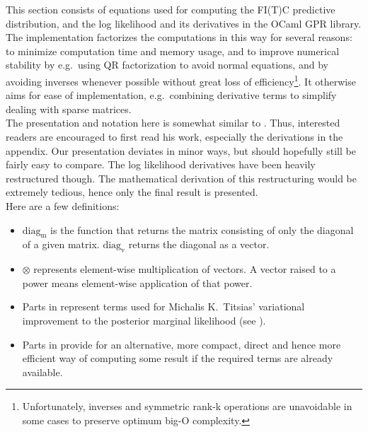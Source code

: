 \documentclass[10pt]{report}
\begin{document}
\newcommand{\Lam}{\mat{\Lambda}}
\newcommand{\Lamss}{\mat{\Lambda}_{\sigma^2}}
\newcommand{\Lamssi}{\imat{\Lambda_{\sigma^2}}}


This section consists of equations used for computing the FI(T)C predictive
distribution, and the log likelihood and its derivatives in the OCaml GPR
library.  The implementation factorizes the computations in this way for several
reasons: to minimize computation time and memory usage, and to improve numerical
stability by e.g.\ using QR factorization to avoid normal equations, and by
avoiding inverses whenever possible without great loss of
efficiency\footnote{Unfortunately, inverses and symmetric rank-k operations are
unavoidable in some cases to preserve optimum big-O complexity.}.  It otherwise
aims for ease of implementation, e.g.\ combining derivative terms to simplify
dealing with sparse matrices.\\

The presentation and notation here is somewhat similar to \cite{SnelsonThesis}.
Thus, interested readers are encouraged to first read his work, especially the
derivations in the appendix.  Our presentation deviates in minor ways, but
should hopefully still be fairly easy to compare.  The log likelihood
derivatives have been heavily restructured though.  The mathematical derivation
of this restructuring would be extremely tedious, hence only the final result is
presented.\\

Here are a few definitions:

\begin{itemize}

\item $\mathrm{diag_m}$ is the function that returns the matrix consisting of
only the diagonal of a given matrix.  $\mathrm{diag_v}$ returns the diagonal as
a vector.

\item $\otimes$ represents element-wise multiplication of vectors.  A vector
raised to a power means element-wise application of that power.

\item Parts in  represent terms used for Michalis K.\ Titsias'
variational improvement to the posterior marginal likelihood (see
\cite{Titsias2009}).

\item Parts in  provide for an alternative, more compact, direct and
hence more efficient way of computing some result if the required terms are
already available.

\end{itemize}
\end{document}
